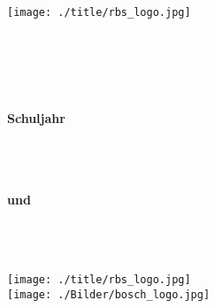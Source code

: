 \begin{titlepage}

\pagestyle{empty}

\begin{minipage}{0.5\textwidth}
\begin{flushleft} \large
\textbf{\MySchuleA} \\
\textbf{\MySchuleB} \\
\textbf{\MyRichtung}
\end{flushleft}
\end{minipage}
%
\begin{minipage}{0.5\textwidth}
\begin{flushright}
\texttt{[image: ./title/rbs\_logo.jpg]}
\end{flushright}
\end{minipage}

\vspace*{8cm} \ \\

\begin{center}
\textbf{{\LARGE \MyTitle}}
\end{center}

\vspace*{9cm} \ \\

\begin{flushleft}
\textbf{\MyAuthor}\\
\textbf{Schuljahr \MySchuljahr}
\end{flushleft}

\cleardoublepage

%
\begin{minipage}{0.5\textwidth}
\begin{flushleft} \large
\textbf{\MySchuleA} \\
\textbf{\MySchuleB} \\
\textbf{\MyRichtung}
\vspace*{3ex}\\
\textbf{und}
\vspace*{3ex} \\
\textbf{\MyFirma}\\
\textbf{\MyAbteilung}\\
\textbf{\MyFirmenStrasse}\\
\textbf{\MyFirmenOrt}
\end{flushleft}
\end{minipage}
%
\begin{minipage}{0.5\textwidth}
\begin{flushright}
\texttt{[image: ./title/rbs\_logo.jpg]}
\vspace*{8ex} \\
\texttt{[image: ./Bilder/bosch\_logo.jpg]}
\end{flushright}
\end{minipage}


\end{titlepage}
